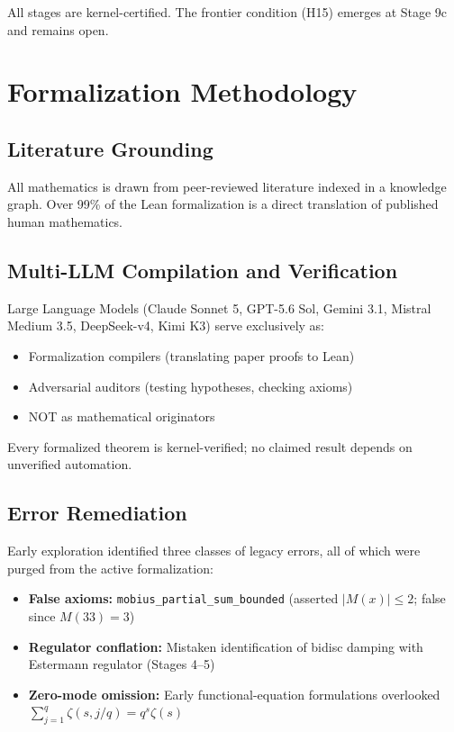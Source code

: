 \documentclass[11pt,a4paper]{article}
\theoremstyle{plain}
\theoremstyle{definition}
\theoremstyle{remark}
\begin{document}
All stages are kernel-certified. The frontier condition (H15) emerges at Stage 9c and remains open.

\section{Formalization Methodology}
\label{sec:methodology}

\subsection{Literature Grounding}

All mathematics is drawn from peer-reviewed literature indexed in a knowledge graph. Over 99\% of the Lean formalization is a direct translation of published human mathematics.

\subsection{Multi-LLM Compilation and Verification}

Large Language Models (Claude Sonnet 5, GPT-5.6 Sol, Gemini 3.1, Mistral Medium 3.5, DeepSeek-v4, Kimi K3) serve exclusively as:
\begin{itemize}[leftmargin=2em]
  \item Formalization compilers (translating paper proofs to Lean)
  \item Adversarial auditors (testing hypotheses, checking axioms)
  \item NOT as mathematical originators
\end{itemize}

Every formalized theorem is kernel-verified; no claimed result depends on unverified automation.

\subsection{Error Remediation}

Early exploration identified three classes of legacy errors, all of which were purged from the active formalization:

\begin{itemize}[leftmargin=2em]
  \item \textbf{False axioms:} \texttt{mobius\_partial\_sum\_bounded} (asserted $|M(x)| \le 2$; false since $M(33)=3$)
  \item \textbf{Regulator conflation:} Mistaken identification of bidisc damping with Estermann regulator (Stages 4--5)
  \item \textbf{Zero-mode omission:} Early functional-equation formulations overlooked $\sum_{j=1}^q \zeta(s, j/q) = q^s \zeta(s)$
\end{itemize}
\end{document}
